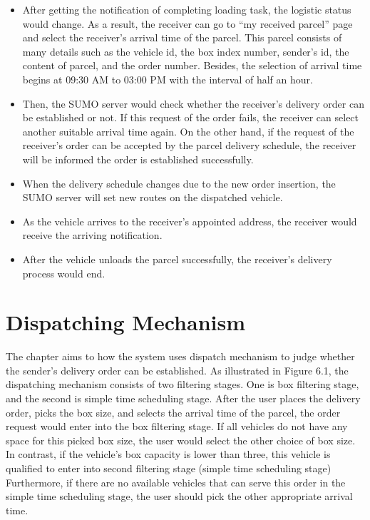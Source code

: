 \documentclass[12pt]{ksthesis}
\begin{document}
\begin{thesis}
{\begin{itemize}
\item
After getting the notification of completing loading task, the logistic status would change. As a result, the receiver can go to “my received parcel” page and select the receiver’s arrival time of the parcel. This parcel consists of many details such as the vehicle id, the box index number, sender’s id, the content of parcel, and the order number. Besides, the selection of arrival time begins at 09:30 AM to 03:00 PM with the interval of half an hour.

\item
Then, the SUMO server would check whether the receiver’s delivery order can be established or not. If this request of the order fails, the receiver can select another suitable arrival time again. On the other hand, if the request of the receiver’s order can be accepted by the parcel delivery schedule, the receiver will be informed the order is established successfully.

\item
When the delivery schedule changes due to the new order insertion, the SUMO server will set new routes on the dispatched vehicle.

\item
As the vehicle arrives to the receiver’s appointed address, the receiver would receive the arriving notification.

\item
After the vehicle unloads the parcel successfully, the receiver’s delivery process would end.

\end{itemize}


\chapter{Dispatching Mechanism}\label{Chap:Dispatching Mechanism}
The chapter aims to how the system uses dispatch mechanism to judge whether the sender’s delivery order can be established.
As illustrated in Figure 6.1, the dispatching mechanism consists of two filtering stages. One is box filtering stage, and the second is simple time scheduling stage. After the user places the delivery order, picks the box size, and selects the arrival time of the parcel, the order request would enter into the box filtering stage.
If all vehicles do not have any space for this picked box size, the user would select the other choice of box size. In contrast, if the vehicle’s box capacity is lower than three, this vehicle is qualified to enter into second filtering stage (simple time scheduling stage) 
Furthermore, if there are no available vehicles that can serve this order in the simple time scheduling stage, the user should pick the other appropriate arrival time.

}
\end{thesis}
\end{document}
